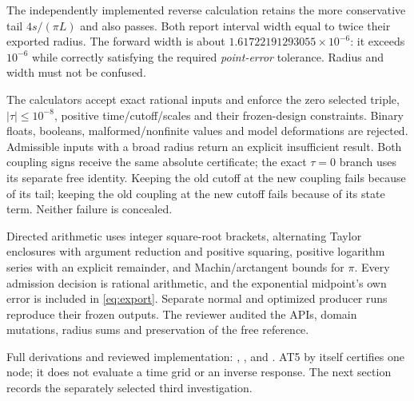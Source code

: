 The independently implemented reverse calculation retains the more
conservative tail $4s/(\pi L)$ and also passes. Both report interval width equal
to twice their exported radius. The forward width is about
$1.61722191293055\times10^{-6}$: it exceeds $10^{-6}$ while correctly satisfying
the required \emph{point-error} tolerance. Radius and width must not be confused.

The calculators accept exact rational inputs and enforce the zero selected
triple, $|\tau|\le10^{-8}$, positive time/cutoff/scales and their frozen-design
constraints. Binary floats, booleans, malformed/nonfinite values and model
deformations are rejected. Admissible inputs with a broad radius return an
explicit insufficient result. Both coupling signs receive the same absolute
certificate; the exact $\tau=0$ branch uses its separate free identity. Keeping
the old cutoff at the new coupling fails because of its tail; keeping the old
coupling at the new cutoff fails because of its state term. Neither failure is
concealed.

Directed arithmetic uses integer square-root brackets, alternating Taylor
enclosures with argument reduction and positive squaring, positive logarithm
series with an explicit remainder, and Machin/arctangent bounds for $\pi$.
Every admission decision is rational arithmetic, and the exponential midpoint's
own error is included in \eqref{eq:export}. Separate normal and optimized
producer runs reproduce their frozen outputs. The reviewer audited the APIs,
domain mutations, radius sums and preservation of the free reference.

Full derivations and reviewed implementation:
,
, and
.
AT5 by itself certifies one node; it does not evaluate a time grid or an inverse
response. The next section records the separately selected third investigation.
